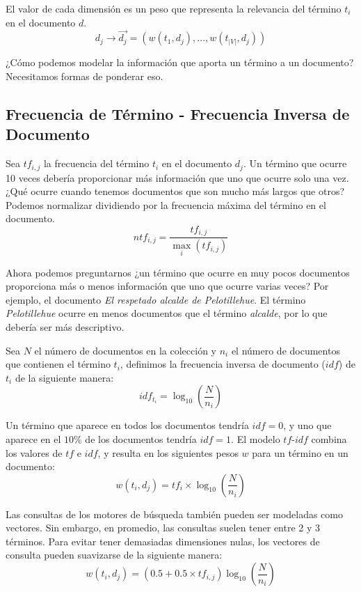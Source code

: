 El valor de cada dimensión es un peso que representa la relevancia del término $t_{i}$ en el documento $d$.
\begin{equation}
d_{j} \rightarrow \overrightarrow{d_{j}}=(w(t_{1},d_{j}),...,w(t_{|V|},d_{j}))
\end{equation}

¿Cómo podemos modelar la información que aporta un término a un documento? Necesitamos formas de ponderar eso.

\subsection{Frecuencia de Término - Frecuencia Inversa de Documento}
Sea $tf_{i,j}$ la frecuencia del término $t_{i}$ en el documento $d_{j}$.  Un término que ocurre 10 veces debería proporcionar más información que uno que ocurre solo una vez. ¿Qué ocurre cuando tenemos documentos que son mucho más largos que otros? Podemos normalizar dividiendo por la frecuencia máxima del término en el documento.
\begin{displaymath}
ntf_{i,j}=\frac{tf_{i,j}}{\max_i (tf_{i,j})}
\end{displaymath}

Ahora podemos preguntarnos ¿un término que ocurre en muy pocos documentos proporciona más o menos información que uno que ocurre varias veces? Por ejemplo, el documento \emph{El respetado alcalde de Pelotillehue}. El término \emph{Pelotillehue} ocurre en menos documentos que el término \emph{alcalde}, por lo que debería ser más descriptivo.

Sea $N$ el número de documentos en la colección y $n_{i}$ el número de documentos que contienen el término $t_{i}$, definimos la frecuencia inversa de documento ($idf$) de $t_{i}$ de la siguiente manera:
\begin{displaymath}
idf_{t_{i}}= \log_{10}\left(\frac{N}{n_{i}}\right)
\end{displaymath}

Un término que aparece en todos los documentos tendría $idf=0$, y uno que aparece en el $10\%$ de los documentos tendría $idf=1$. El modelo $tf$-$idf$ combina los valores de $tf$ e $idf$, y resulta en los siguientes pesos $w$ para un término en un documento:
\begin{displaymath}
w(t_{i},d_{j})=tf_{i}\times \log_{10}\left(\frac{N}{n_{i}}\right)
\end{displaymath}

Las consultas de los motores de búsqueda también pueden ser modeladas como vectores. Sin embargo, en promedio, las consultas suelen tener entre 2 y 3 términos. Para evitar tener demasiadas dimensiones nulas, los vectores de consulta pueden suavizarse de la siguiente manera:
\begin{displaymath}
w(t_{i},d_{j})=(0.5+0.5\times tf_{i,j})\log_{10}\left(\frac{N}{n_{i}}\right)
\end{displaymath}

